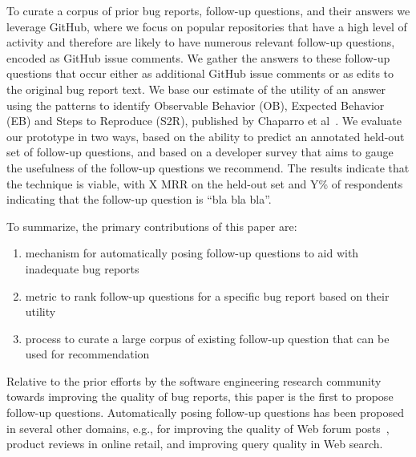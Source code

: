 To curate a corpus of prior bug reports, follow-up questions, and their answers we leverage GitHub, where we focus on popular repositories that have a high level of activity and therefore are likely to have numerous relevant follow-up questions, encoded as GitHub issue comments. We gather the answers to these follow-up questions that occur either as additional GitHub issue comments or as edits to the original bug report text. We base our estimate of the utility of an answer using the patterns to identify Observable Behavior (OB), Expected Behavior (EB) and Steps to Reproduce (S2R), published by Chaparro et al~\cite{chaparro17detecting}. We evaluate our prototype in two ways, based on the ability to predict an annotated held-out set of follow-up questions, and based on a developer survey that aims to gauge the usefulness of the follow-up questions we recommend. The results indicate that the technique is viable, with X MRR on the held-out set and Y\% of respondents indicating that the follow-up question is “bla bla bla”.

To summarize, the primary contributions of this paper are:
\begin{enumerate}
\item mechanism for automatically posing follow-up questions to aid with inadequate bug reports
\item metric to rank follow-up questions for a specific bug report based on their utility
\item process to curate a large corpus of existing follow-up question that can be used for recommendation
\end{enumerate}

Relative to the prior efforts by the software engineering research community towards improving the quality of bug reports, this paper is the first to propose follow-up questions. Automatically posing follow-up questions has been proposed in several other domains, e.g.,  for improving the quality of Web forum posts~\cite{rao-daume-iii-2018-learning}, product reviews in online retail, and improving query quality in Web search.

%
